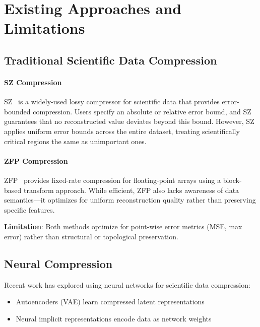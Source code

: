 \section{Existing Approaches and Limitations}
\label{sec:related}


\subsection{Traditional Scientific Data Compression}

\paragraph{SZ Compression}
SZ~\cite{sz2016} is a widely-used lossy compressor for scientific data that provides error-bounded compression. Users specify an absolute or relative error bound, and SZ guarantees that no reconstructed value deviates beyond this bound. However, SZ applies uniform error bounds across the entire dataset, treating scientifically critical regions the same as unimportant ones.

\paragraph{ZFP Compression}
ZFP~\cite{zfp2014} provides fixed-rate compression for floating-point arrays using a block-based transform approach. While efficient, ZFP also lacks awareness of data semantics---it optimizes for uniform reconstruction quality rather than preserving specific features.

\textbf{Limitation}: Both methods optimize for point-wise error metrics (MSE, max error) rather than structural or topological preservation.

\subsection{Neural Compression}

Recent work has explored using neural networks for scientific data compression:
\begin{itemize}
    \item Autoencoders (VAE) learn compressed latent representations
    \item Neural implicit representations encode data as network weights
\end{itemize}

